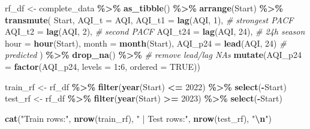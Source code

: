 \documentclass[
]{article}
\newenvironment{Shaded}{\begin{snugshade}}{\end{snugshade}}
\newcommand{\AttributeTok}[1]{\textcolor[rgb]{0.13,0.29,0.53}{#1}}
\newcommand{\CommentTok}[1]{\textcolor[rgb]{0.56,0.35,0.01}{\textit{#1}}}
\newcommand{\ConstantTok}[1]{\textcolor[rgb]{0.56,0.35,0.01}{#1}}
\newcommand{\DecValTok}[1]{\textcolor[rgb]{0.00,0.00,0.81}{#1}}
\newcommand{\FunctionTok}[1]{\textcolor[rgb]{0.13,0.29,0.53}{\textbf{#1}}}
\newcommand{\NormalTok}[1]{#1}
\newcommand{\OtherTok}[1]{\textcolor[rgb]{0.56,0.35,0.01}{#1}}
\newcommand{\SpecialCharTok}[1]{\textcolor[rgb]{0.81,0.36,0.00}{\textbf{#1}}}
\newcommand{\StringTok}[1]{\textcolor[rgb]{0.31,0.60,0.02}{#1}}
\begin{document}
\begin{Shaded}
\begin{Highlighting}[]
\NormalTok{rf\_df }\OtherTok{\textless{}{-}}\NormalTok{ complete\_data }\SpecialCharTok{\%\textgreater{}\%}
  \FunctionTok{as\_tibble}\NormalTok{() }\SpecialCharTok{\%\textgreater{}\%}
  \FunctionTok{arrange}\NormalTok{(Start) }\SpecialCharTok{\%\textgreater{}\%}
  \FunctionTok{transmute}\NormalTok{(}
\NormalTok{    Start,}
    \AttributeTok{AQI\_t =}\NormalTok{ AQI,}
    \AttributeTok{AQI\_t1 =} \FunctionTok{lag}\NormalTok{(AQI, }\DecValTok{1}\NormalTok{), }\CommentTok{\# strongest PACF}
    \AttributeTok{AQI\_t2 =} \FunctionTok{lag}\NormalTok{(AQI, }\DecValTok{2}\NormalTok{), }\CommentTok{\# second PACF}
    \AttributeTok{AQI\_t24 =} \FunctionTok{lag}\NormalTok{(AQI, }\DecValTok{24}\NormalTok{), }\CommentTok{\# 24h season}
    \AttributeTok{hour =} \FunctionTok{hour}\NormalTok{(Start),}
    \AttributeTok{month =} \FunctionTok{month}\NormalTok{(Start),}
    \AttributeTok{AQI\_p24 =} \FunctionTok{lead}\NormalTok{(AQI, }\DecValTok{24}\NormalTok{) }\CommentTok{\# predicted}
\NormalTok{  ) }\SpecialCharTok{\%\textgreater{}\%}
  \FunctionTok{drop\_na}\NormalTok{() }\SpecialCharTok{\%\textgreater{}\%}  \CommentTok{\# remove lead/lag NAs}
  \FunctionTok{mutate}\NormalTok{(}\AttributeTok{AQI\_p24 =} \FunctionTok{factor}\NormalTok{(AQI\_p24, }\AttributeTok{levels =} \DecValTok{1}\SpecialCharTok{:}\DecValTok{6}\NormalTok{, }\AttributeTok{ordered =} \ConstantTok{TRUE}\NormalTok{))}


\NormalTok{train\_rf }\OtherTok{\textless{}{-}}\NormalTok{ rf\_df }\SpecialCharTok{\%\textgreater{}\%} \FunctionTok{filter}\NormalTok{(}\FunctionTok{year}\NormalTok{(Start) }\SpecialCharTok{\textless{}=} \DecValTok{2022}\NormalTok{) }\SpecialCharTok{\%\textgreater{}\%} \FunctionTok{select}\NormalTok{(}\SpecialCharTok{{-}}\NormalTok{Start)}
\NormalTok{test\_rf  }\OtherTok{\textless{}{-}}\NormalTok{ rf\_df }\SpecialCharTok{\%\textgreater{}\%} \FunctionTok{filter}\NormalTok{(}\FunctionTok{year}\NormalTok{(Start) }\SpecialCharTok{\textgreater{}=} \DecValTok{2023}\NormalTok{) }\SpecialCharTok{\%\textgreater{}\%} \FunctionTok{select}\NormalTok{(}\SpecialCharTok{{-}}\NormalTok{Start)}

\FunctionTok{cat}\NormalTok{(}\StringTok{"Train rows:"}\NormalTok{, }\FunctionTok{nrow}\NormalTok{(train\_rf), }\StringTok{" | Test rows:"}\NormalTok{, }\FunctionTok{nrow}\NormalTok{(test\_rf), }\StringTok{"}\SpecialCharTok{\textbackslash{}n}\StringTok{"}\NormalTok{)}
\end{Highlighting}
\end{Shaded}
\end{document}
